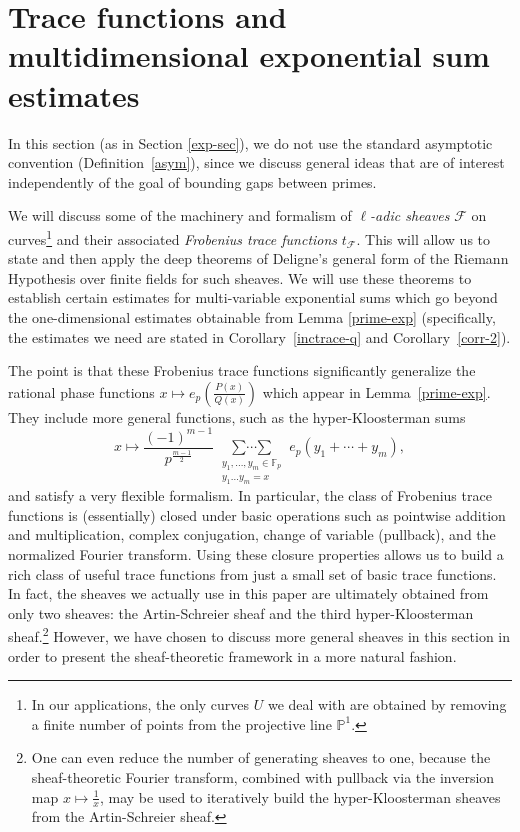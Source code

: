 \documentclass[12pt,a4paper,reqno]{amsart}
\numberwithin{equation}{section}
\theoremstyle{plain}
\theoremstyle{definition}
\newcommand\F{\mathbb{F}}
\newcommand\mcF{\mathcal{F}}
\newcommand\Pl{\mathbb{P}^1}
\newcommand\Fp{\F_{p}}
\newcommand\multsum{\mathop{\sum\cdots\sum}\limits}
\begin{document}






\section{Trace functions and multidimensional exponential sum
  estimates}\label{deligne-sec}

In this section (as in Section \ref{exp-sec}), we do not use the standard asymptotic convention
(Definition~\ref{asym}), since we discuss general ideas that are of
interest independently of the goal of bounding gaps between primes.
\par
We will discuss some of the machinery and formalism of
\emph{$\ell$-adic sheaves} $\mcF$ on curves\footnote{In our
  applications, the only curves $U$ we deal with are obtained by
  removing a finite number of points from the projective line $\Pl$.}
and their associated \emph{Frobenius trace functions} $t_{\mcF}$. This
will allow us to state and then apply the deep theorems of Deligne's
general form of the Riemann Hypothesis over finite fields for such
sheaves. We will use these theorems to establish certain estimates for
multi-variable exponential sums which go beyond the one-dimensional
estimates obtainable from Lemma \ref{prime-exp} (specifically, the
estimates we need are stated in Corollary~\ref{inctrace-q} and 
Corollary~\ref{corr-2}).  
\par
The point is that these Frobenius trace functions significantly
generalize the rational phase functions $x \mapsto
e_p\left(\frac{P(x)}{Q(x)}\right)$ which appear in
Lemma~\ref{prime-exp}. They include more general functions, such as the
hyper-Kloosterman sums 
$$
x \mapsto \frac{(-1)^{m-1}}{p^{\frac{m-1}{2}}}
\multsum_{\substack{y_1,\ldots,y_m \in \Fp\\ y_1 \ldots y_m = x}} e_p(
y_1 + \cdots + y_m ),
$$
and satisfy a very flexible formalism. In particular, the class of Frobenius 
trace functions is (essentially)
closed under basic operations such as pointwise addition and
multiplication, complex conjugation, change of variable
(pullback),
and the normalized Fourier transform.  Using these closure properties
allows us to build a rich class of useful trace functions from just a
small set of basic trace functions.  In fact, the sheaves we actually
use in this paper are ultimately obtained from only two sheaves: the
Artin-Schreier sheaf and the third hyper-Kloosterman sheaf.\footnote{One can even reduce the number of generating
  sheaves to one, because the sheaf-theoretic Fourier transform,
  combined with pullback via the inversion map $x \mapsto\frac{1}{x}$,
  may be used to iteratively build the hyper-Kloosterman sheaves from
  the Artin-Schreier sheaf.} However, we have chosen to discuss more
general sheaves in this section in order to present the
sheaf-theoretic framework in a more natural fashion.
\end{document}
